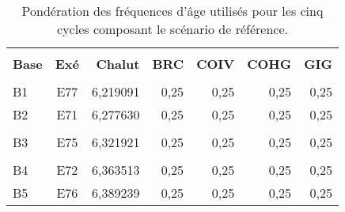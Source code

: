 \documentclass[11pt]{book}
\begin{document}
\setlength{\tabcolsep}{6pt}
\begin{table}[!h]
\centering
\caption{Pond\'{e}ration des fr\'{e}quences d'\^{a}ge utilis\'{e}s pour les cinq cycles composant le sc\'{e}nario de r\'{e}f\'{e}rence.}
\label{tab:baseAFwts}
\usefont{\encodingdefault}{\familydefault}{\seriesdefault}{\shapedefault}\small
\begin{tabular}{lcrrrrr}
\hline \\ [-1.5ex]
{\bf Base} & {\bf Ex\'{e}} & {\bf Chalut} & {\bf BRC} & {\bf COIV} & {\bf COHG} & {\bf GIG} \\ [0.2ex]
\hline \\ [-1.5ex]
B1 & E77 & 6,219091 & 0,25 & 0,25 & 0,25 & 0,25 \\
B2 & E71 & 6,277630 & 0,25 & 0,25 & 0,25 & 0,25 \\
\hdashline \\ [-1.75ex]
B3 & E75 & 6,321921 & 0,25 & 0,25 & 0,25 & 0,25 \\
\hdashline \\ [-1.5ex]
B4 & E72 & 6,363513 & 0,25 & 0,25 & 0,25 & 0,25 \\
B5 & E76 & 6,389239 & 0,25 & 0,25 & 0,25 & 0,25 \\
\hline
\end{tabular}
\usefont{\encodingdefault}{\familydefault}{\seriesdefault}{\shapedefault}\normalsize
\end{table}

\end{document}
